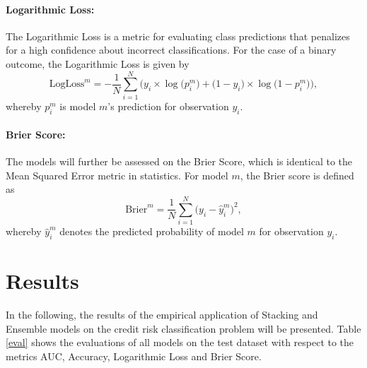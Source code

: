 \documentclass[12pt]{article}
\begin{document}
\paragraph{Logarithmic Loss:} The Logarithmic Loss is a metric for evaluating class predictions that penalizes for a high confidence about incorrect classifications. For the case of a binary outcome, the Logarithmic Loss is given by\\
\begin{equation}
\text{LogLoss}^m = - \frac{1}{N}\sum_{i=1}^{N}\big(y_i\times\log\big(p^m_i\big) + \big(1 - y_i\big)\times\log\big(1 - p^m_i\big)\big),
\end{equation}
whereby $p^m_i$ is model $m$'s prediction for observation $y_i$.

\paragraph{Brier Score:} The models will further be assessed on the Brier Score, which is identical to the Mean Squared Error metric in statistics. For model $m$, the Brier score is defined as 
\begin{equation}
\text{Brier}^m = \frac{1}{N}\sum_{i=1}^{N}\big(y_i - \hat{y}^m_i\big)^2,
\end{equation}
whereby $\hat{y}^m_i$ denotes the predicted probability of model $m$ for observation $y_i$. 


\section{Results}\label{results}
In the following, the results of the empirical application of Stacking and Ensemble models on the credit risk classification problem will be presented. Table \ref{eval} shows the evaluations of all models on the test dataset with respect to the metrics AUC, Accuracy, Logarithmic Loss and Brier Score. 
\end{document}
